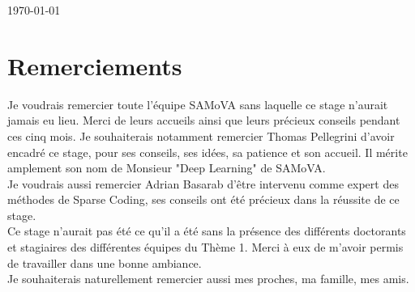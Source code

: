 \documentclass[a4paper,10pt]{report}
\begin{document}
\begin{titlepage}
	\vfill %
	
	{\large\today} %
	

	
	\vfill %
	
\end{titlepage}


\chapter*{Remerciements}

Je voudrais remercier toute l'équipe SAMoVA sans laquelle ce stage n'aurait jamais eu lieu. Merci de leurs accueils ainsi que leurs précieux conseils pendant ces cinq mois. Je souhaiterais notamment remercier Thomas Pellegrini d'avoir encadré ce stage, pour ses conseils, ses idées, sa patience et son accueil. Il mérite amplement son nom de Monsieur "Deep Learning" de SAMoVA.\\

Je voudrais aussi remercier Adrian Basarab d'être intervenu comme expert des méthodes de Sparse Coding, ses conseils ont été précieux dans la réussite de ce stage.\\

Ce stage n'aurait pas été ce qu'il a été sans la présence des différents doctorants et stagiaires des différentes équipes du Thème 1. Merci à eux de m'avoir permis de travailler dans une bonne ambiance.\\

Je souhaiterais naturellement remercier aussi mes proches, ma famille, mes amis.\\
\end{document}
